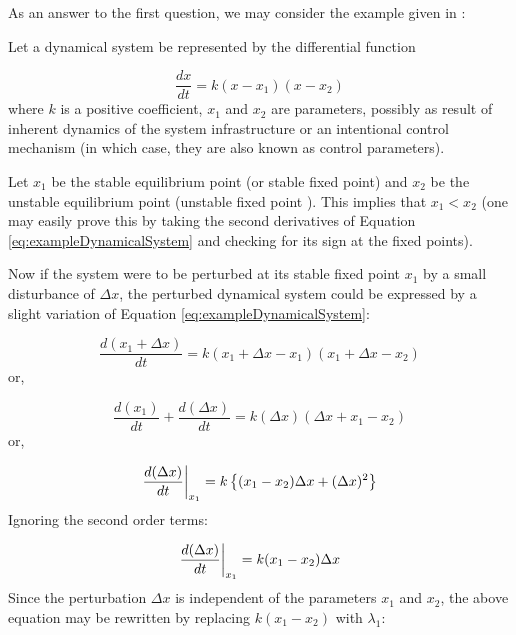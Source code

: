As an answer to the first question, we may consider the example given in \cite{schefferEarlyWarningSignalsForCriticalTransitions}:

Let a dynamical system be represented by the differential function

\begin{equation}
	\label{eq:exampleDynamicalSystem}
	\frac{dx}{dt} = k(x-x_1)(x-x_2)
\end{equation}
where $k$ is a positive coefficient, $x_1$ and $x_2$ are parameters, possibly as result of inherent dynamics of the system infrastructure or an intentional control mechanism (in which case, they are also known as control parameters).

Let $x_1$ be the stable equilibrium point (or stable fixed point) and $x_2$ be the unstable equilibrium point (unstable fixed point	). This implies that $x_1 < x_2$ (one may easily prove this by taking the second derivatives of Equation \ref{eq:exampleDynamicalSystem} and checking for its sign at the fixed points).

Now if the system were to be perturbed at its stable fixed point $x_1$ by a small disturbance of $\Delta x$, the perturbed dynamical system could be expressed by a slight variation of Equation \ref{eq:exampleDynamicalSystem}:

\begin{equation}
	\frac{d(x_1+\Delta x)}{dt} = k(x_1+\Delta x-x_1)(x_1+\Delta x - x_2)
\end{equation}
\hspace{25pt} or,

\begin{equation}
	\frac{d(x_1)}{dt} + \frac{d(\Delta x)}{dt} = k(\Delta x)(\Delta x + x_1 - x_2)
\end{equation}
\hspace{25pt} or,

\begin{equation}
	\evalat[\bigg]{\frac{d(\Delta x)}{dt}}{x_1} = k\left\{(x_1-x_2)\Delta x + (\Delta x)^2\right\}
\end{equation}
\hspace{25pt} Ignoring the second order terms:

\begin{equation}
	\evalat[\bigg]{\frac{d(\Delta x)}{dt}}{x_1} = k(x_1-x_2)\Delta x
\end{equation}
\hspace{25pt} Since the perturbation $\Delta x$ is independent of the parameters $x_1$ and $x_2$, the above equation may be rewritten by replacing $k(x_1-x_2)$ with $\lambda_1$:

